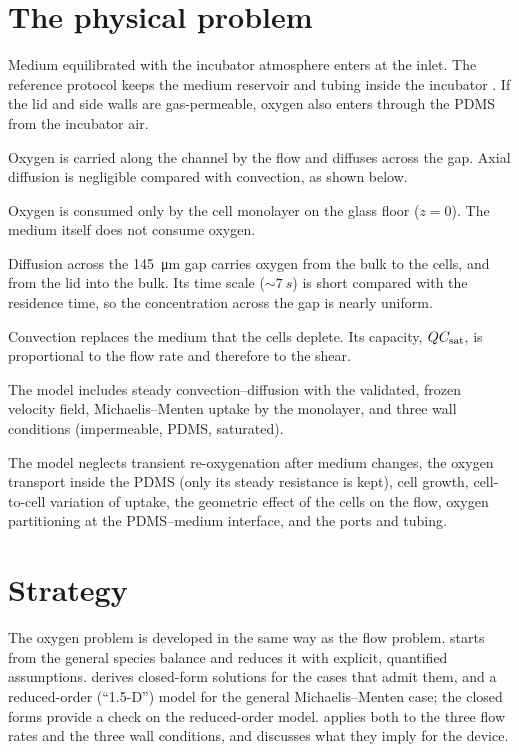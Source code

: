 \section{The physical problem}

\begin{description}[leftmargin=0pt]
\item[Where oxygen enters.] Medium equilibrated with the incubator atmosphere enters at the inlet. The reference protocol keeps the medium reservoir and tubing inside the incubator \citep{Delon2020}. If the lid and side walls are gas-permeable, oxygen also enters through the PDMS from the incubator air.
\item[Where it is transported.] Oxygen is carried along the channel by the flow and diffuses across the gap. Axial diffusion is negligible compared with convection, as shown below.
\item[Where it is consumed.] Oxygen is consumed only by the cell monolayer on the glass floor ($z=0$). The medium itself does not consume oxygen.
\item[Role of diffusion.] Diffusion across the \SI{145}{\micro\metre} gap carries oxygen from the bulk to the cells, and from the lid into the bulk. Its time scale ($\sim\SI{7}{s}$) is short compared with the residence time, so the concentration across the gap is nearly uniform.
\item[Role of convection.] Convection replaces the medium that the cells deplete. Its capacity, $QC_{\mathrm{sat}}$, is proportional to the flow rate and therefore to the shear.
\item[Included.] The model includes steady convection--diffusion with the validated, frozen velocity field, Michaelis--Menten uptake by the monolayer, and three wall conditions (impermeable, PDMS, saturated).
\item[Neglected.] The model neglects transient re-oxygenation after medium changes, the oxygen transport inside the PDMS (only its steady resistance is kept), cell growth, cell-to-cell variation of uptake, the geometric effect of the cells on the flow, oxygen partitioning at the PDMS--medium interface, and the ports and tubing.
\end{description}

\section{Strategy}

The oxygen problem is developed in the same way as the flow problem.  starts from the general species balance and reduces it with explicit, quantified assumptions.  derives closed-form solutions for the cases that admit them, and a reduced-order (``1.5-D'') model for the general Michaelis--Menten case; the closed forms provide a check on the reduced-order model.  applies both to the three flow rates and the three wall conditions, and discusses what they imply for the device.
